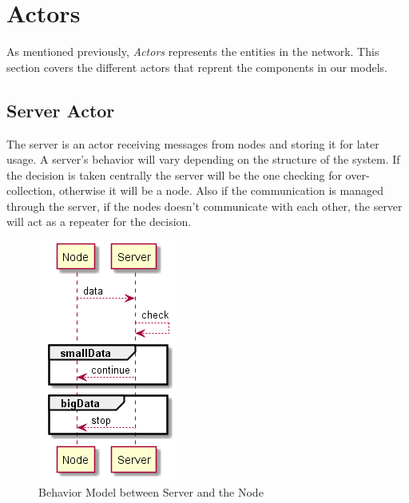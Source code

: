 





\section{Actors}

As mentioned previously, \textit{Actors} represents the entities in the network. This section covers the different actors that reprent the components in our models. 



\subsection{Server Actor}

The server is an actor receiving messages from nodes and storing it for later usage. A server's behavior will vary depending on the structure of the system. If the decision is taken centrally the server will be the one checking for over-collection, otherwise it will be a node. Also if the communication is managed through the server, if the nodes doesn't communicate with each other, the server will act as a repeater for the decision. 

\begin{figure}[ht]
    \includegraphics{include/figures/server_behav}
    \caption{Behavior Model between Server and the Node}
    \label{fig:node_server_behav}
\end{figure}

